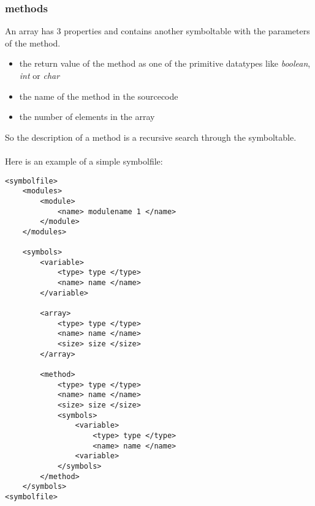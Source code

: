 \subsubsection{methods}
An array has 3 properties and contains another symboltable with the parameters
of the method. 
\begin{itemize}
  \item the return value of the method as one of the primitive datatypes
  like \emph{boolean}, \emph{int} or \emph{char}
  \item the name of the method in the sourcecode
  \item the number of elements in the array
\end{itemize}
So the description of a method is a recursive search through the symboltable.
\\ \\
Here is an example of a simple symbolfile: 
\begin{lstlisting}[caption={Example symbolfile}]
<symbolfile>
	<modules>
		<module>
			<name> modulename 1 </name>
		</module>
	</modules>

	<symbols>
		<variable>
			<type> type </type>
			<name> name </name>
		</variable>

		<array>
			<type> type </type>
			<name> name </name>
			<size> size </size>
		</array>
	
		<method>
			<type> type </type>
			<name> name </name>
			<size> size </size>
			<symbols>
				<variable>
					<type> type </type>
					<name> name </name>
				<variable>
			</symbols>
		</method>
	</symbols>
<symbolfile>
\end{lstlisting}
